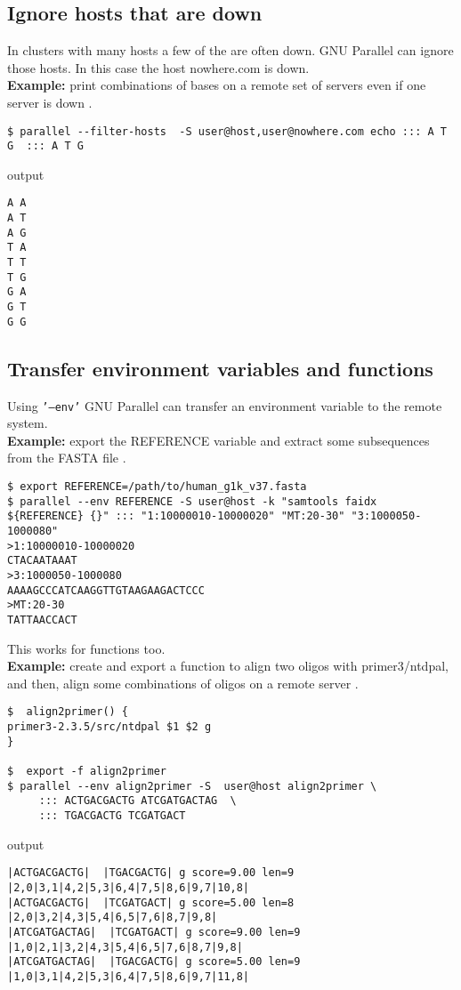 \documentclass{article}
\newcommand{\example}[1]{
\textbf{Example: } {\color[rgb]{0,0,1} #1 } .
}
\newcommand{\cmdoption}[1]{\texttt{'#1'}}
\begin{document}
\subsection{Ignore hosts that are down}
In clusters with many hosts a few of the are often down. GNU Parallel can ignore those hosts. In this case the host nowhere.com is down.\\
\example{print combinations of bases on a remote set of servers even if one server is down}
\begin{lstlisting}
$ parallel --filter-hosts  -S user@host,user@nowhere.com echo ::: A T G  ::: A T G 
\end{lstlisting}
output
\begin{lstlisting}
A A
A T
A G
T A
T T
T G
G A
G T
G G
\end{lstlisting}

\subsection{Transfer environment variables and functions}
Using \cmdoption{--env} GNU Parallel can transfer an environment variable to the remote system.\\
\example{export the REFERENCE variable and extract some subsequences from the FASTA file}
\begin{lstlisting}
$ export REFERENCE=/path/to/human_g1k_v37.fasta
$ parallel --env REFERENCE -S user@host -k "samtools faidx ${REFERENCE} {}" ::: "1:10000010-10000020" "MT:20-30" "3:1000050-1000080"
>1:10000010-10000020
CTACAATAAAT
>3:1000050-1000080
AAAAGCCCATCAAGGTTGTAAGAAGACTCCC
>MT:20-30
TATTAACCACT
\end{lstlisting}

This works for functions too.\\
\example{create and export a function to align two oligos with primer3/ntdpal, and then, align some combinations of oligos on a remote server}
\begin{lstlisting}
$  align2primer() {
primer3-2.3.5/src/ntdpal $1 $2 g
}

$  export -f align2primer
$ parallel --env align2primer -S  user@host align2primer \
	 ::: ACTGACGACTG ATCGATGACTAG  \
	 ::: TGACGACTG TCGATGACT
\end{lstlisting}
output
\begin{lstlisting}
|ACTGACGACTG|  |TGACGACTG| g score=9.00 len=9 |2,0|3,1|4,2|5,3|6,4|7,5|8,6|9,7|10,8|
|ACTGACGACTG|  |TCGATGACT| g score=5.00 len=8 |2,0|3,2|4,3|5,4|6,5|7,6|8,7|9,8|
|ATCGATGACTAG|  |TCGATGACT| g score=9.00 len=9 |1,0|2,1|3,2|4,3|5,4|6,5|7,6|8,7|9,8|
|ATCGATGACTAG|  |TGACGACTG| g score=5.00 len=9 |1,0|3,1|4,2|5,3|6,4|7,5|8,6|9,7|11,8|
\end{lstlisting}
\end{document}
